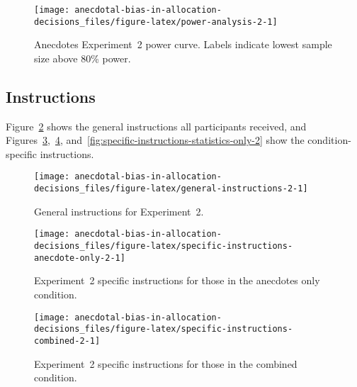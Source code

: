 \documentclass[
  man, donotrepeattitle,floatsintext]{apa7}
\theoremstyle{definition}
\theoremstyle{definition}
\theoremstyle{definition}
\theoremstyle{definition}
\theoremstyle{remark}
\begin{document}
\newpage

\begin{landscape}



\begin{figure}
\texttt{[image: anecdotal-bias-in-allocation-decisions\_files/figure-latex/power-analysis-2-1]} \caption{Anecdotes Experiment~2 power curve. Labels indicate lowest sample size above 80\% power.}\label{fig:power-analysis-2}
\end{figure}

\end{landscape}

\newpage

\hypertarget{instructions-materials-2-appendix}{%
\subsection{Instructions}\label{instructions-materials-2-appendix}}

Figure~\ref{fig:general-instructions-2} shows the general
instructions all participants received, and
Figures~\ref{fig:specific-instructions-anecdote-only-2},~\ref{fig:specific-instructions-combined-2},
and~\ref{fig:specific-instructions-statistics-only-2} show
the condition-specific instructions.



\begin{figure}
\texttt{[image: anecdotal-bias-in-allocation-decisions\_files/figure-latex/general-instructions-2-1]} \caption{General instructions for Experiment~2.}\label{fig:general-instructions-2}
\end{figure}



\begin{figure}
\texttt{[image: anecdotal-bias-in-allocation-decisions\_files/figure-latex/specific-instructions-anecdote-only-2-1]} \caption{Experiment~2 specific instructions for those in the anecdotes only condition.}\label{fig:specific-instructions-anecdote-only-2}
\end{figure}



\begin{figure}
\texttt{[image: anecdotal-bias-in-allocation-decisions\_files/figure-latex/specific-instructions-combined-2-1]} \caption{Experiment~2 specific instructions for those in the combined condition.}\label{fig:specific-instructions-combined-2}
\end{figure}
\end{document}
